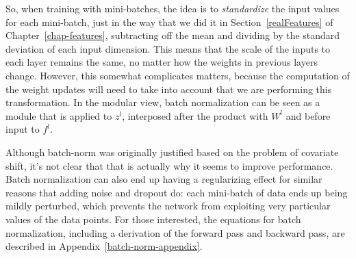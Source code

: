 So, when training with mini-batches, the idea is to {\em standardize}
the input values for each mini-batch, just in the way that we did it
in Section~\ref{realFeatures} of Chapter~\ref{chap-features}, subtracting off the mean
and dividing by the standard deviation of each input dimension.  This
means that the scale of the inputs to each layer remains the same, no
matter how the weights in previous layers change.  However, this
somewhat complicates matters, because the computation of the weight
updates will need to take into account that we are performing this
transformation.  In the modular view, batch normalization can be seen
as a module that is applied to $z^l$, interposed after the product
with $W^l$ and before input to $f^l$.

Although batch-norm was originally justified based on the problem of
covariate shift, it's not clear that that is actually why it seems to
improve performance.
Batch normalization can also end up having a regularizing effect for similar
reasons that adding noise and dropout do:  each mini-batch of data
ends up being mildly perturbed, which prevents the network from
exploiting very particular values of the data points.
For those interested, the equations for batch normalization, including a derivation of the forward pass and backward pass, are described in Appendix~\ref{batch-norm-appendix}.





